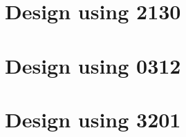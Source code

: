 
 \begin{center}




 \end{center}



\section{Design using 2130}


 \begin{center}




 \end{center}



\section{Design using 0312}


 \begin{center}




 \end{center}



\section{Design using 3201}


